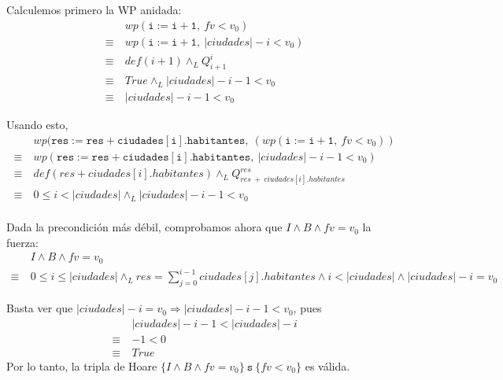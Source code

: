 \documentclass[10pt,a4paper]{article}
\begin{document}
Calculemos primero la WP anidada:
\begin{equation*}
    \begin{split}
    & wp(\mathtt{i := i + 1}, \ fv < v_0) \\
    \equiv \ & wp(\mathtt{i := i + 1}, \ |ciudades| - i < v_0) \\
    \equiv \ & def(i + 1) \land_L Q_{i + 1}^{i} \\
    \equiv \ & True \land_L |ciudades| - i - 1 < v_0 \\
    \equiv \ & |ciudades| - i - 1 < v_0
    \end{split}
\end{equation*}

Usando esto,
\begin{equation*}
    \begin{split}
    & wp(\mathtt{res := res + ciudades[i].habitantes}, \ (wp(\mathtt{i := i + 1}, \ fv < v_0)) \\
    \equiv \ & wp(\mathtt{res := res + ciudades[i].habitantes}, \ |ciudades| - i - 1 < v_0) \\
    \equiv \ & def(res + ciudades[i].habitantes) \land_L Q_{res \ + \ ciudades[i].habitantes}^{res} \\
    \equiv \ & 0 \leq i < |ciudades| \land_L |ciudades| - i - 1 < v_0 \\
    \end{split}
\end{equation*}

Dada la precondición más débil, comprobamos ahora que $I \land B \land fv = v_0$ la fuerza:
\begin{equation*}
    \begin{split}
    & I \land B \land fv = v_0 \\
    \equiv \ & 0 \leq i \leq |ciudades| \land_L res = \sum_{j = 0}^{i - 1} ciudades[j].habitantes \land i < |ciudades| \land |ciudades| - i = v_0
    \end{split}
\end{equation*}

Basta ver que $|ciudades| - i = v_0 \Rightarrow |ciudades| - i - 1 < v_0$, pues 
\begin{equation*}
    \begin{split}
    & |ciudades| - i - 1 < |ciudades| - i \\
    \equiv \ & -1 < 0 \\
    \equiv \ & True
    \end{split}
\end{equation*}
Por lo tanto, la tripla de Hoare $\{I \land B \land fv = v_0\} \ \mathtt{s} \ \{fv < v_0\}$ es válida. \\
\end{document}
